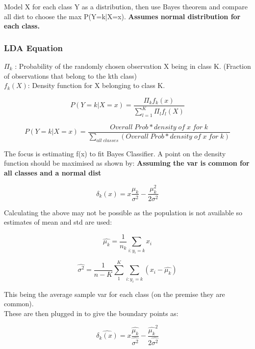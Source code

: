 \documentclass[11pt]{scrartcl} %
\begin{document}
Model X for each class Y as a distribution, then use Bayes theorem and compare all dist to choose the max P(Y=k|X=x).
\textbf{Assumes normal distribution for each class.}

\subsubsection{LDA Equation}

\(\Pi_k\) : Probability of the randomly chosen observation X being in class K. (Fraction of observations that belong to the kth class)\\

\(f_k(X)\): Density function for X belonging to class K.

\begin{equation}
	P(Y=k|X=x) = \frac{\Pi_kf_k(x)}{\sum^K_{l=1}{\Pi_lf_l(X)}}
\end{equation}

\begin{equation}
	P(Y=k|X=x) = \frac{Overall\; Prob * density\; of \; x \; for \; k}{\sum_{all\; classes}(Overall\; Prob * density\; of \; x \; for \; k)}
\end{equation}

The focus is estimating f(x) to fit Bayes Classifier. A point on the density function should be maximised as shown by:
\textbf{Assuming the var is common for all classes and a normal dist}

\begin{equation}
	\delta_k(x) = x\frac{\mu_k}{\sigma^2} - \frac{\mu_k^2}{2\sigma^2}
\end{equation}

Calculating the above may not be possible as the population is not available so estimates of mean and std are used:

\begin{equation}
	\hat{\mu_k} = \frac{1}{n_k}\sum_{i:y_i=k}{x_i}
\end{equation}


\begin{equation}
	\hat{\sigma^2}  = \frac{1}{n-K}\sum^K_1\sum_{i:y_i=k}(x_i - \hat{\mu_k})
\end{equation}

This being the average sample var for each class (on the premise they are common).\\

These are then plugged in to give the boundary points as:

\begin{equation}
	\hat{\delta_k(x)} = x\frac{\hat{\mu_k}}{\hat{\sigma^2}} - \frac{\hat{\mu_k}^2}{2\hat{\sigma^2}}
\end{equation}
\end{document}
